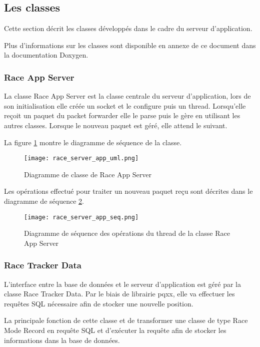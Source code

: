 \subsection{Les classes}

Cette section décrit les classes développés dans le cadre du serveur d'application.

Plus d'informations sur les classes sont disponible en annexe de ce document dans la documentation Doxygen.

\subsubsection{Race App Server}

La classe Race App Server est la classe centrale du serveur d'application, lors de son initialisation elle créée un socket et le configure puis un thread. Lorsqu'elle reçoit un paquet du packet forwarder elle le parse puis le gère en utilisant les autres classes. Lorsque le nouveau paquet est géré, elle attend le suivant.

La figure \ref{fig:race_app_server_uml} montre le diagramme de séquence de la classe.

\begin{figure}[htb]
\centering 
\texttt{[image: race\_server\_app\_uml.png]} 
\caption{Diagramme de classe de Race App Server}
\label{fig:race_app_server_uml}
\end{figure}

Les opérations effectué pour traiter un nouveau paquet reçu sont décrites dans le diagramme de séquence \ref{fig:race_app_server_seq}.

\begin{figure}[htb]
\centering 
\texttt{[image: race\_server\_app\_seq.png]} 
\caption{Diagramme de séquence des opérations du thread de la classe Race App Server}
\label{fig:race_app_server_seq}
\end{figure}

\subsubsection{Race Tracker Data}

L'interface entre la base de données et le serveur d'application est géré par la classe Race Tracker Data. Par le biais de librairie pqxx, elle va effectuer les requêtes SQL nécessaire afin de stocker une nouvelle position.

La principale fonction de cette classe et de transformer une classe de type Race Mode Record en requête SQL et d'exécuter la requête afin de stocker les informations dans la base de données.

